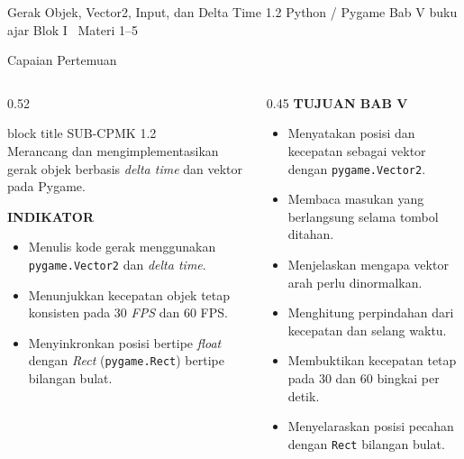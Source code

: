 \documentclass[aspectratio=169,10pt]{beamer}
\begin{document}
  {Gerak Objek, Vector2, Input, dan Delta Time}
  {1.2}
  {Python / Pygame}
  {Bab V buku ajar}
  {Blok I \textperiodcentered\ Materi 1--5}

\begin{frame}{Capaian Pertemuan}
\begin{columns}[T,onlytextwidth]
  \begin{column}{0.52\textwidth}
    \begin{beamercolorbox}[wd=\linewidth,sep=5pt,rounded=true]{block title}
      {\fontsize{6.8}{8}\selectfont\color{ubHead}SUB-CPMK 1.2}\\[2pt]
      {\footnotesize Merancang dan mengimplementasikan gerak objek berbasis
       \emph{delta time} dan vektor pada Pygame.}
    \end{beamercolorbox}
    \vspace{0.16cm}

    {\fontsize{7}{8.5}\selectfont\bfseries\color{ubAccent}INDIKATOR}\par
    \vspace{0.06cm}
    \begin{itemize}
      \item Menulis kode gerak menggunakan \texttt{pygame.Vector2} dan
            \emph{delta time}.
      \item Menunjukkan kecepatan objek tetap konsisten pada 30 \emph{FPS} dan
            60 FPS.
      \item Menyinkronkan posisi bertipe \emph{float} dengan \emph{Rect}
            (\texttt{pygame.Rect}) bertipe bilangan bulat.
    \end{itemize}
  \end{column}
  \begin{column}{0.45\textwidth}
    {\fontsize{7}{8.5}\selectfont\bfseries\color{ubAccent}TUJUAN BAB V}\par
    \vspace{0.08cm}
    \begin{itemize}
      \item Menyatakan posisi dan kecepatan sebagai vektor dengan
            \texttt{pygame.Vector2}.
      \item Membaca masukan yang berlangsung selama tombol ditahan.
      \item Menjelaskan mengapa vektor arah perlu dinormalkan.
      \item Menghitung perpindahan dari kecepatan dan selang waktu.
      \item Membuktikan kecepatan tetap pada 30 dan 60 bingkai per detik.
      \item Menyelaraskan posisi pecahan dengan \texttt{Rect} bilangan bulat.
    \end{itemize}
  \end{column}
\end{columns}
\end{frame}
\end{document}
